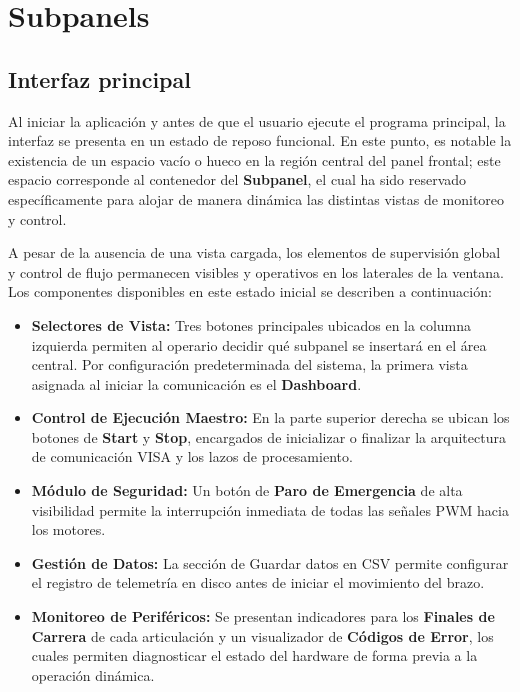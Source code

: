 \clearpage

\section{Subpanels}
\subsection{Interfaz principal}
Al iniciar la aplicación y antes de que el usuario ejecute el programa principal, la interfaz se presenta en un estado de reposo funcional. En este punto, es notable la existencia de un espacio vacío o hueco en la región central del panel frontal; este espacio corresponde al contenedor del \textbf{Subpanel}, el cual ha sido reservado específicamente para alojar de manera dinámica las distintas vistas de monitoreo y control.

A pesar de la ausencia de una vista cargada, los elementos de supervisión global y control de flujo permanecen visibles y operativos en los laterales de la ventana. Los componentes disponibles en este estado inicial se describen a continuación:

\begin{itemize}
	\item \textbf{Selectores de Vista:} Tres botones principales ubicados en la columna izquierda permiten al operario decidir qué subpanel se insertará en el área central. Por configuración predeterminada del sistema, la primera vista asignada al iniciar la comunicación es el \textbf{Dashboard}.
	\item \textbf{Control de Ejecución Maestro:} En la parte superior derecha se ubican los botones de \textbf{Start} y \textbf{Stop}, encargados de inicializar o finalizar la arquitectura de comunicación VISA y los lazos de procesamiento.
	\item \textbf{Módulo de Seguridad:} Un botón de \textbf{Paro de Emergencia} de alta visibilidad permite la interrupción inmediata de todas las señales PWM hacia los motores.
	\item \textbf{Gestión de Datos:} La sección de Guardar datos en CSV permite configurar el registro de telemetría en disco antes de iniciar el movimiento del brazo.
	\item \textbf{Monitoreo de Periféricos:} Se presentan indicadores para los \textbf{Finales de Carrera} de cada articulación y un visualizador de \textbf{Códigos de Error}, los cuales permiten diagnosticar el estado del hardware de forma previa a la operación dinámica.
\end{itemize}


